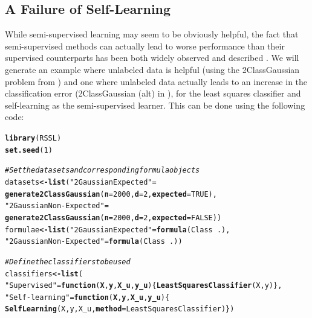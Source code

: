 \documentclass[twoside]{memoir}\usepackage[]{graphicx}\usepackage{xcolor}
\makeatletter
\newcommand{\hlnum}[1]{\textcolor[rgb]{0,0,0}{#1}}%
\newcommand{\hlstr}[1]{\textcolor[rgb]{0,0,0}{#1}}%
\newcommand{\hlcom}[1]{\textcolor[rgb]{0.4,0.4,0.4}{\textit{#1}}}%
\newcommand{\hlopt}[1]{\textcolor[rgb]{0,0,0}{\textbf{#1}}}%
\newcommand{\hlstd}[1]{\textcolor[rgb]{0,0,0}{#1}}%
\newcommand{\hlkwa}[1]{\textcolor[rgb]{0,0,0}{\textbf{#1}}}%
\newcommand{\hlkwb}[1]{\textcolor[rgb]{0,0,0}{\textbf{#1}}}%
\newcommand{\hlkwc}[1]{\textcolor[rgb]{0,0,0}{\textbf{#1}}}%
\newcommand{\hlkwd}[1]{\textcolor[rgb]{0,0,0}{\textbf{#1}}}%
\newenvironment{kframe}{%
 \def\at@end@of@kframe{}%
 \ifinner\ifhmode%
  \def\at@end@of@kframe{\end{minipage}}%
  \begin{minipage}{\columnwidth}%
 \fi\fi%
 \def\FrameCommand##1{\hskip\@totalleftmargin \hskip-\fboxsep
 \colorbox{shadecolor}{##1}\hskip-\fboxsep
     \hskip-\linewidth \hskip-\@totalleftmargin \hskip\columnwidth}%
 \MakeFramed {\advance\hsize-\width
   \@totalleftmargin\z@ \linewidth\hsize
   \@setminipage}}%
 {\par\unskip\endMakeFramed%
 \at@end@of@kframe}
\newenvironment{knitrout}{}{} %
\renewcommand{\cite}{\citep}
\makeatother
\begin{document}
\subsection{A Failure of Self-Learning}
While semi-supervised learning may seem to be obviously helpful, the fact that semi-supervised methods can actually lead to worse performance than their supervised counterparts has been both widely observed and described \cite{Cozman2003}. We will generate an example where unlabeled data is helpful (using the 2ClassGaussian problem from ) and one where unlabeled data actually leads to an increase in the classification error (2ClassGaussian (alt) in ), for the least squares classifier and self-learning as the semi-supervised learner. This can be done using the following code:
\begin{knitrout}
\color{fgcolor}\begin{kframe}
\begin{alltt}
\hlkwd{library}\hlstd{(RSSL)}
\hlkwd{set.seed}\hlstd{(}\hlnum{1}\hlstd{)}

\hlcom{# Set the datasets and corresponding formula objects}
\hlstd{datasets} \hlkwb{<-} \hlkwd{list}\hlstd{(}\hlstr{"2 Gaussian Expected"}\hlstd{=}
                   \hlkwd{generate2ClassGaussian}\hlstd{(}\hlkwc{n}\hlstd{=}\hlnum{2000}\hlstd{,}\hlkwc{d}\hlstd{=}\hlnum{2}\hlstd{,}\hlkwc{expected}\hlstd{=}\hlnum{TRUE}\hlstd{),}
                 \hlstr{"2 Gaussian Non-Expected"}\hlstd{=}
                   \hlkwd{generate2ClassGaussian}\hlstd{(}\hlkwc{n}\hlstd{=}\hlnum{2000}\hlstd{,}\hlkwc{d}\hlstd{=}\hlnum{2}\hlstd{,}\hlkwc{expected}\hlstd{=}\hlnum{FALSE}\hlstd{))}
\hlstd{formulae} \hlkwb{<-} \hlkwd{list}\hlstd{(}\hlstr{"2 Gaussian Expected"}\hlstd{=}\hlkwd{formula}\hlstd{(Class}\hlopt{~}\hlstd{.),}
                 \hlstr{"2 Gaussian Non-Expected"}\hlstd{=}\hlkwd{formula}\hlstd{(Class}\hlopt{~}\hlstd{.))}

\hlcom{# Define the classifiers to be used}
\hlstd{classifiers} \hlkwb{<-} \hlkwd{list}\hlstd{(}
  \hlstr{"Supervised"} \hlstd{=} \hlkwa{function}\hlstd{(}\hlkwc{X}\hlstd{,}\hlkwc{y}\hlstd{,}\hlkwc{X_u}\hlstd{,}\hlkwc{y_u}\hlstd{) \{} \hlkwd{LeastSquaresClassifier}\hlstd{(X,y)\},}
  \hlstr{"Self-learning"} \hlstd{=} \hlkwa{function}\hlstd{(}\hlkwc{X}\hlstd{,}\hlkwc{y}\hlstd{,}\hlkwc{X_u}\hlstd{,}\hlkwc{y_u}\hlstd{) \{}
                \hlkwd{SelfLearning}\hlstd{(X,y,X_u,}\hlkwc{method} \hlstd{= LeastSquaresClassifier)\})}


\end{alltt}
\end{kframe}
\end{knitrout}
\end{document}
